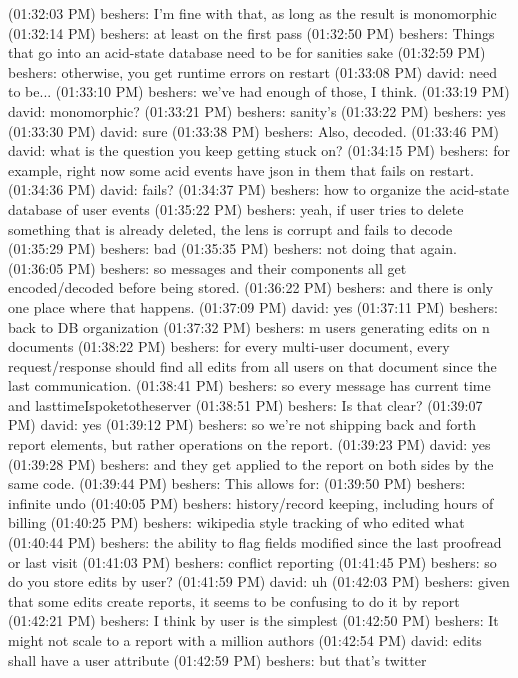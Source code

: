 (01:32:03 PM) beshers: I'm fine with that, as long as the result is monomorphic
(01:32:14 PM) beshers: at least on the first pass
(01:32:50 PM) beshers: Things that go into an acid-state database need to be
for sanities sake
(01:32:59 PM) beshers: otherwise, you get runtime errors on restart
(01:33:08 PM) david: need to be...
(01:33:10 PM) beshers: we've had enough of those, I think.
(01:33:19 PM) david: monomorphic?
(01:33:21 PM) beshers: sanity's
(01:33:22 PM) beshers: yes
(01:33:30 PM) david: sure
(01:33:38 PM) beshers: Also, decoded.
(01:33:46 PM) david: what is the question you keep getting stuck on?
(01:34:15 PM) beshers: for example, right now some acid events have json in
them that fails on restart.
(01:34:36 PM) david: fails?
(01:34:37 PM) beshers: how to organize the acid-state database of user events
(01:35:22 PM) beshers: yeah, if user tries to delete something that is already
deleted, the lens is corrupt and fails to decode
(01:35:29 PM) beshers: bad
(01:35:35 PM) beshers: not doing that again.
(01:36:05 PM) beshers: so messages and their components all get encoded/decoded
before being stored.
(01:36:22 PM) beshers: and there is only one place where that happens.
(01:37:09 PM) david: yes
(01:37:11 PM) beshers: back to DB organization
(01:37:32 PM) beshers: m users generating edits on n documents
(01:38:22 PM) beshers: for every multi-user document, every request/response
should find all edits from all users on that document since the last
communication.
(01:38:41 PM) beshers: so every message has current time and
lasttimeIspoketotheserver
(01:38:51 PM) beshers: Is that clear?
(01:39:07 PM) david: yes
(01:39:12 PM) beshers: so we're not shipping back and forth report elements,
but rather operations on the report.
(01:39:23 PM) david: yes
(01:39:28 PM) beshers: and they get applied to the report on both sides by the
same code.
(01:39:44 PM) beshers: This allows for:
(01:39:50 PM) beshers: infinite undo
(01:40:05 PM) beshers: history/record keeping, including hours of billing
(01:40:25 PM) beshers: wikipedia style tracking of who edited what
(01:40:44 PM) beshers: the ability to flag fields modified since the last
proofread or last visit
(01:41:03 PM) beshers: conflict reporting
(01:41:45 PM) beshers: so do you store edits by user?
(01:41:59 PM) david: uh
(01:42:03 PM) beshers: given that some edits create reports, it seems to be
confusing to do it by report
(01:42:21 PM) beshers: I think by user is the simplest
(01:42:50 PM) beshers: It might not scale to a report with a million authors
(01:42:54 PM) david: edits shall have a user attribute
(01:42:59 PM) beshers: but that's twitter
